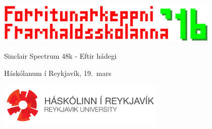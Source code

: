 \documentclass[12pt,a4paper]{problemset}
\begin{document}
\begin{titlepage}
    \centering
    \includegraphics[width=0.8\textwidth]{fklogo}\\
    \vspace{1cm}
    {\Huge Sinclair Spectrum 48k - Eftir hádegi \par}
    \vspace{0.5cm}
    {\LARGE Háskólanum í Reykjavík, 19.\ mars \par}
    \vspace{2cm}
    { \Huge \tableofcontents }
    \vfill
    \includegraphics[width=0.6\textwidth]{horizontal_white.png}
\end{titlepage}

\setcounter{problemcount}{6}

\end{document}
